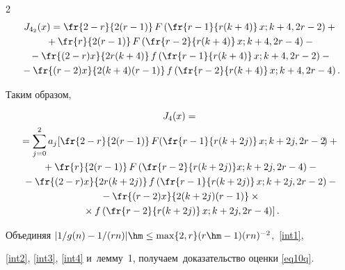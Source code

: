 \begin{multicols}{2}
\begin{multline*}
 J_{4_2}(x) =  \fr{2-r}{2(r-1)}\, F\left( \fr{r-1}{r(k+4)}\,x;k+4,2r-2\right) 


+ {}\\


{}+\fr{r}{2(r-1)}\,F\left( \fr{r-2}{r(k+4)}\, x;k+4,2r-4\right) -{}\\


{}-   \fr{(2-r)x}{2r(k+4)} \,f\left( \fr{r-1}{r(k+4)} \,x;k+4,2r-2\right)


 -{}\\


 {}- \fr{(r-2)x}{2(k+4)(r-1)}\,f\left( \fr{r-2}{r(k+4)} \,x;k+4,2r-4\right).


\end{multline*}


Таким образом,


\begin{multline}


 J_{4}(x) ={}\\


 {}= \sum\limits_{j=0}^{2} a_j  \!\left[ \fr{2-r}{2(r-1)} \,F\!\left( \fr{r-


1}{r(k+2j)}\,x;k+2j,2r-2\!\right)+{} \right.{}\hspace*{-0.42361pt}\\


{}+


\fr{r}{2(r-1)}\,F\left( \fr{r-2}{r(k+2j)} x;k+2j,2r-4\right) - {}\\


{}- \fr{(2-r)x}{2r(k+2j)} \,f\left( \fr{r-1}{r(k+2j)}\, x;k+2j,2r-2\right) - 


{}\\


{}-  \fr{(r-2)x}{2(k+2j)(r-1)}\times{}\\


\left.{}\times f\left( \fr{r-2}{r(k+2j)}\,x;k+2j,2r-


4\right) \right].


\label{int4}


\end{multline}





Объединяя $|1/g(n) -1/(r n)| \hm\leq \max\{2 , r\} (r\hm-1) (rn)^{-2} $,~\eqref{int1}, 


\eqref{int2}, \eqref{int3}, \eqref{int4} и~лемму~1, получаем~доказательство оценки \eqref{eq10q}.






\end{multicols}
